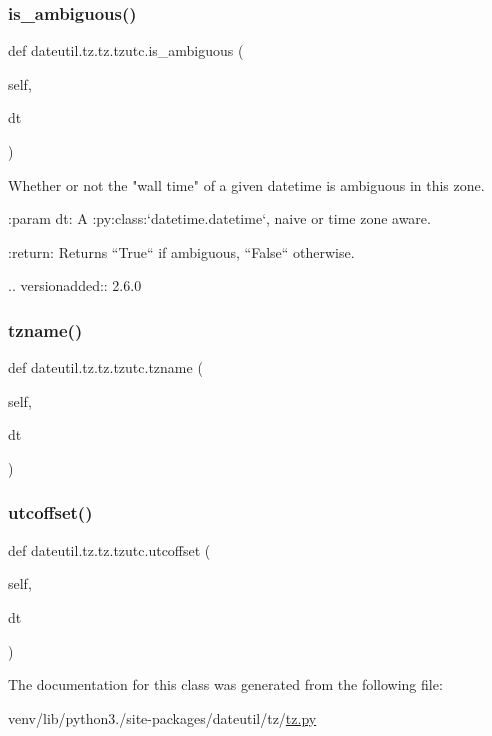 \subsubsection{\texorpdfstring{is\+\_\+ambiguous()}{is\_ambiguous()}}
{\footnotesize\ttfamily def dateutil.\+tz.\+tz.\+tzutc.\+is\+\_\+ambiguous (\begin{DoxyParamCaption}\item[{}]{self,  }\item[{}]{dt }\end{DoxyParamCaption})}

\begin{DoxyVerb}Whether or not the "wall time" of a given datetime is ambiguous in this
zone.

:param dt:
    A :py:class:`datetime.datetime`, naive or time zone aware.


:return:
    Returns ``True`` if ambiguous, ``False`` otherwise.

.. versionadded:: 2.6.0
\end{DoxyVerb}
 \mbox{\label{classdateutil_1_1tz_1_1tz_1_1tzutc_a1828b8080ae35b15063af36d17ba1fd2}} 
\subsubsection{\texorpdfstring{tzname()}{tzname()}}
{\footnotesize\ttfamily def dateutil.\+tz.\+tz.\+tzutc.\+tzname (\begin{DoxyParamCaption}\item[{}]{self,  }\item[{}]{dt }\end{DoxyParamCaption})}

\mbox{\label{classdateutil_1_1tz_1_1tz_1_1tzutc_ade9369259a30b9b7c3bc5911375d4333}} 
\subsubsection{\texorpdfstring{utcoffset()}{utcoffset()}}
{\footnotesize\ttfamily def dateutil.\+tz.\+tz.\+tzutc.\+utcoffset (\begin{DoxyParamCaption}\item[{}]{self,  }\item[{}]{dt }\end{DoxyParamCaption})}



The documentation for this class was generated from the following file\+:\begin{DoxyCompactItemize}
\item 
venv/lib/python3./site-\/packages/dateutil/tz/\hyperlink{tz_8py}{tz.\+py}\end{DoxyCompactItemize}
